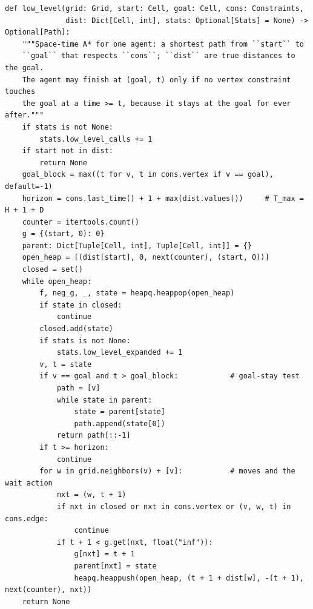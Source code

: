 \begin{lstlisting}[caption={The low level: space-time \astar under constraints, with the goal-stay test and the horizon $T_{\max} = H + 1 + D$ (from \code{code/ch09\_cbs.py}).},label={lst:ch09-lowlevel}]
def low_level(grid: Grid, start: Cell, goal: Cell, cons: Constraints,
              dist: Dict[Cell, int], stats: Optional[Stats] = None) -> Optional[Path]:
    """Space-time A* for one agent: a shortest path from ``start`` to
    ``goal`` that respects ``cons``; ``dist`` are true distances to the goal.
    The agent may finish at (goal, t) only if no vertex constraint touches
    the goal at a time >= t, because it stays at the goal for ever after."""
    if stats is not None:
        stats.low_level_calls += 1
    if start not in dist:
        return None
    goal_block = max((t for v, t in cons.vertex if v == goal), default=-1)
    horizon = cons.last_time() + 1 + max(dist.values())     # T_max = H + 1 + D
    counter = itertools.count()
    g = {(start, 0): 0}
    parent: Dict[Tuple[Cell, int], Tuple[Cell, int]] = {}
    open_heap = [(dist[start], 0, next(counter), (start, 0))]
    closed = set()
    while open_heap:
        f, neg_g, _, state = heapq.heappop(open_heap)
        if state in closed:
            continue
        closed.add(state)
        if stats is not None:
            stats.low_level_expanded += 1
        v, t = state
        if v == goal and t > goal_block:            # goal-stay test
            path = [v]
            while state in parent:
                state = parent[state]
                path.append(state[0])
            return path[::-1]
        if t >= horizon:
            continue
        for w in grid.neighbors(v) + [v]:           # moves and the wait action
            nxt = (w, t + 1)
            if nxt in closed or nxt in cons.vertex or (v, w, t) in cons.edge:
                continue
            if t + 1 < g.get(nxt, float("inf")):
                g[nxt] = t + 1
                parent[nxt] = state
                heapq.heappush(open_heap, (t + 1 + dist[w], -(t + 1), next(counter), nxt))
    return None
\end{lstlisting}

